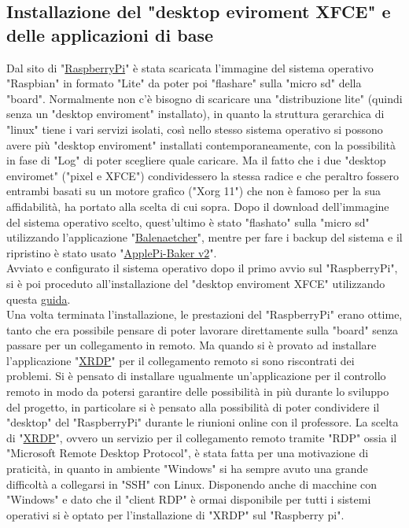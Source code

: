\subsection{Installazione del "desktop eviroment XFCE" e delle applicazioni di base}
\raggedright
Dal sito di "\href{https://www.raspberrypi.com/software/operating-systems/}{RaspberryPi}" è stata scaricata l'immagine del sistema operativo "Raspbian" in formato "Lite" da poter poi "flashare" sulla "micro sd" della "board".  Normalmente non c'è bisogno di scaricare una "distribuzione lite" (quindi senza un "desktop enviroment" installato), in quanto la struttura gerarchica di "linux" tiene i vari servizi isolati, così nello stesso sistema operativo si possono avere più "desktop enviroment" installati contemporaneamente, con la possibilità in fase di "Log" di poter scegliere quale caricare. Ma il fatto che i due "desktop enviromet" ("pixel e XFCE") condividessero la stessa radice e che peraltro fossero entrambi basati su un motore grafico ("Xorg 11") che non è famoso per la sua affidabilità, ha portato alla scelta di cui sopra. 
Dopo il download dell'immagine del sistema operativo scelto, quest'ultimo è stato "flashato" sulla "micro sd" utilizzando l'applicazione "\href{https://etcher.balena.io/}{Balenaetcher}", mentre per fare i backup del sistema e il ripristino è stato usato "\href{https://www.tweaking4all.com/software/macosx-software/applepi-baker-v2/}{ApplePi-Baker v2}". \\
Avviato e configurato il sistema operativo dopo il primo avvio sul "RaspberryPi", si è poi proceduto all'installazione del "desktop enviroment XFCE" utilizzando questa \href{https://www.makeuseof.com/desktop-environments-you-can-run-on-a-raspberry-pi/}{guida}.\\
Una volta terminata l'installazione, le prestazioni del "RaspberryPi" erano ottime, tanto che era possibile pensare di poter lavorare direttamente sulla "board" senza passare per un collegamento in remoto. Ma quando si è provato ad installare l'applicazione "\href{https://github.com/neutrinolabs/xrdp}{XRDP}" per il collegamento remoto si sono riscontrati dei problemi. Si è pensato di installare ugualmente un'applicazione per il controllo remoto in modo da potersi garantire delle possibilità in più durante lo sviluppo del progetto, in particolare si è pensato alla possibilità di poter condividere il "desktop" del "RaspberryPi" durante le riunioni online con il professore. La scelta di "\href{https://github.com/neutrinolabs/xrdp}{XRDP}", ovvero un servizio per il collegamento remoto tramite "RDP" ossia il "Microsoft Remote Desktop Protocol", è stata fatta per una motivazione di praticità, in quanto in ambiente "Windows" si ha sempre avuto una grande difficoltà a collegarsi in "SSH" con Linux. Disponendo anche di macchine con "Windows" e dato che il "client RDP" è ormai disponibile per tutti i sistemi operativi si è optato per l'installazione di "XRDP" sul "Raspberry pi".\\
